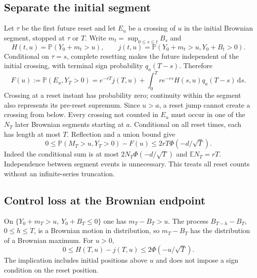 \documentclass[11pt,a4paper]{article}
\newcommand{\Prob}{\mathbb P}
\newcommand{\E}{\mathbb E}
\newcommand{\dd}{\,\mathrm d}
\begin{document}
\subsection{Separate the initial segment}
Let $\tau$ be the first future reset and let $E_u$ be a crossing of $u$
in the initial Brownian segment, stopped at $\tau$ or $T$.
Write $m_t=\sup_{0\leq s\leq t}B_s$ and
\[
H(t,u)=\Prob(Y_0+m_t>u),\qquad
j(t,u)=\Prob(Y_0+m_t>u,Y_0+B_t>0).
\]
Conditional on $\tau=s$, complete resetting makes the future independent of
the initial crossing, with terminal sign probability $q_a(T-s)$. Therefore
\begin{equation}\label{eq:F}
F(u):=\Prob(E_u,Y_T>0)
=e^{-rT}j(T,u)+\int_0^T re^{-rs}H(s,u)q_a(T-s)\dd s.
\end{equation}
Crossing at a reset instant has probability zero; continuity within the segment
also represents its pre-reset supremum. Since $u>a$, a reset jump cannot create
a crossing from below. Every crossing not counted in $E_u$ must occur in one
of the $N_T$ later Brownian segments starting at $a$.
Conditional on all reset times, each has length at most $T$. Reflection and
a union bound give
\begin{equation}\label{eq:later}
0\leq \Prob(M_T>u,Y_T>0)-F(u)
\leq 2rT\Phi(-d/\sqrt T).
\end{equation}
Indeed the conditional sum is at most $2N_T\Phi(-d/\sqrt T)$ and
$\E N_T=rT$. Independence between segment events is unnecessary. This treats
all reset counts without an infinite-series truncation.

\subsection{Control loss at the Brownian endpoint}
On $\{Y_0+m_T>u,\ Y_0+B_T\leq0\}$ one has $m_T-B_T>u$.
The process $B_{T-h}-B_T$, $0\leq h\leq T$, is a Brownian motion in distribution,
so $m_T-B_T$ has the distribution of a Brownian maximum. For $u>0$,
\begin{equation}\label{eq:loss}
0\leq H(T,u)-j(T,u)\leq2\Phi(-u/\sqrt T).
\end{equation}
The implication includes initial positions above $u$ and does not impose a sign
condition on the reset position.
\end{document}

